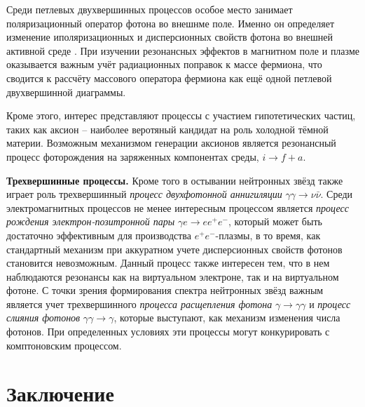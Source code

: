 \documentclass[12pt]{article}
\begin{document}
 Среди петлевых двухвершинных процессов особое место занимает поляризационный оператор фотона во внешнме поле. Именно он определяет изменение иполяризационных и дисперсионных свойств фотона во внешней 
 активной среде . При изучении резонансных эффектов в магнитном поле и плазме оказывается важным учёт радиационных поправок к массе фермиона, что сводится к рассчёту массового оператора фермиона как ещё 
 одной петлевой двухвершинной диаграммы.
 
 Кроме этого, интерес представляют процессы с участием гипотетических частиц, таких как аксион -- наиболее веротяный кандидат на роль холодной тёмной материи. Возможным механизмом генерации 
 аксионов является резонансный процесс фоторождения на заряженных компонентах среды, $i \to f + a$.
		
{\bf Трехвершинные процессы.} Кроме того в остывании нейтронных звёзд также играет роль трехвершинный	
\textit{процесс двухфотонной аннигиляции} $\gamma\gamma\to\nu \bar{\nu}$. Среди электромагнитных процессов не менее интересным процессом является 
\textit{процесс рождения электрон-позитронной пары} $\gamma e \to e e^+e^-$, который может быть достаточно эффективным для производства $e^+e^-$-плазмы, в то время, как стандартный механизм 
при аккуратном учете дисперсионных свойств фотонов становится невозможным. Данный процесс также интересен тем, что в нем наблюдаются резонансы как на виртуальном электроне, так и на виртуальном фотоне. 
С точки зрения формирования спектра нейтронных звёзд важным является учет трехвершинного \textit{процесса расщепления фотона} $\gamma \to \gamma \gamma$ и \textit{процесс слияния фотонов} 
$\gamma \gamma \to \gamma$, которые выступают, как механизм изменения числа фотонов. При определенных условиях эти процессы могут конкурировать с комптоновским процессом.  \\
	
\section{Заключение}
\newpage


\end{document}

